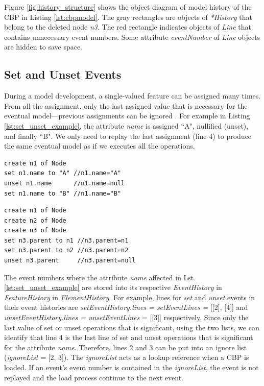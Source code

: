 \documentclass{llncs}
\begin{document}
Figure \ref{fig:history_structure} shows the object diagram of model history of the CBP in Listing \ref{lst:cbpmodel}. The gray rectangles are objects of \emph{*History} that belong to the deleted node \emph{n3}. The red rectangle indicates objects of \emph{Line} that contains unnecessary event numbers. Some attribute \emph{eventNumber} of \emph{Line} objects are hidden to save space.     

\subsection{Set and Unset Events}
\label{subsec:set_and_unset_events}
During a model development, a single-valued feature can be assigned many times. From all the assignment, only the last assigned value that is necessary for the eventual model---previous assignments can be ignored . For example in Listing \ref{lst:set_unset_example}, the attribute \emph{name} is assigned ``A", nullified (unset), and finally ``B". We only need to replay the last assignment (line 4) to produce the same eventual model as if we executes all the operations. 

\noindent
\begin{minipage}[t]{0.49\linewidth}
\begin{lstlisting}[style=eol,caption={The CBP representation of attribute \emph{name} assignments.},label=lst:set_unset_example]
create n1 of Node
set n1.name to "A" //n1.name="A"    
unset n1.name      //n1.name=null
set n1.name to "B" //n1.name="B"
\end{lstlisting}
\end{minipage}
\hfill
\begin{minipage}[t]{0.49\linewidth}
\begin{lstlisting}[style=eol,caption={The CBP representation of reference  \emph{parent} assignments.},label=lst:set_unset_reference]
create n1 of Node
create n2 of Node
create n3 of Node
set n3.parent to n1 //n3.parent=n1
set n3.parent to n2 //n3.parent=n2
unset n3.parent     //n3.parent=null
\end{lstlisting}
\end{minipage}

The event numbers where the attribute \emph{name} affected in Lst. \ref{lst:set_unset_example} are stored into its respective \emph{EventHistory} in \emph{FeatureHistory} in \emph{ElementHistory}. For example, lines for \emph{set} and \emph{unset} events in their event histories are \emph{setEventHistory.lines = setEventLines =} [[2], [4]] and \emph{unsetEventHistory.lines = unsetEventLines} = [[3]] respectively. Since only the last value of set or unset operations that is significant, using the two lists, we can identify that line 4 is the last line of set and unset operations that is significant for the attribute \emph{name}. Therefore, lines 2 and 3 can be put into an ignore list (\emph{ignoreList} = [2, 3]). The \emph{ignoreList} acts as a lookup reference when a CBP is loaded. If an event's event number is contained in the \emph{ignoreList}, the event is not replayed and the load process continue to the next event.
\end{document}
